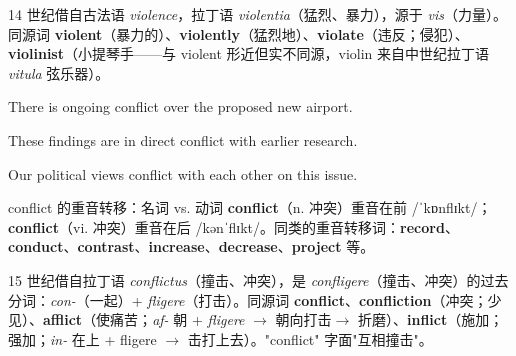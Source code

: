 \documentclass[../main.tex]{subfiles}
\begin{document}
\begin{origin}
14 世纪借自古法语 \textit{ violence}，拉丁语 \textit{violentia}（猛烈、暴力），源于 \textit{vis}（力量）。同源词 \textbf{violent}（暴力的）、\textbf{violently}（猛烈地）、\textbf{violate}（违反；侵犯）、\textbf{violinist}（小提琴手——与 violent 形近但实不同源，violin 来自中世纪拉丁语 \textit{vitula} 弦乐器）。
\end{origin}



{There is ongoing conflict over the proposed new airport.}

{These findings are in direct conflict with earlier research.}

{Our political views conflict with each other on this issue.}

\begin{gram}{conflict 的重音转移：名词 vs. 动词}
\textbf{conflict}（n. 冲突）重音在前 /ˈkɒnflɪkt/；\textbf{conflict}（vi. 冲突）重音在后 /kənˈflɪkt/。同类的重音转移词：\textbf{record}、\textbf{conduct}、\textbf{contrast}、\textbf{increase}、\textbf{decrease}、\textbf{project} 等。
\end{gram}

\begin{origin}
15 世纪借自拉丁语 \textit{conflictus}（撞击、冲突），是 \textit{confligere}（撞击、冲突）的过去分词：\textit{con-}（一起）+ \textit{fligere}（打击）。同源词 \textbf{conflict}、\textbf{confliction}（冲突；少见）、\textbf{afflict}（使痛苦；\textit{af-} 朝 + \textit{fligere} $\to$ 朝向打击$\to$ 折磨）、\textbf{inflict}（施加；强加；\textit{in-} 在上 + fligere $\to$ 击打上去）。"conflict" 字面"互相撞击"。
\end{origin}


\end{document}

